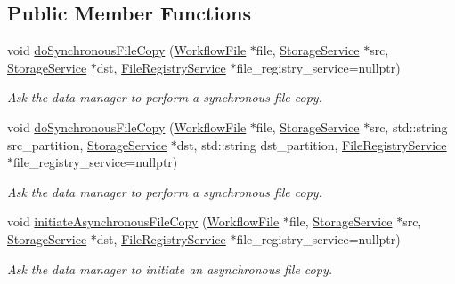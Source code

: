 \subsection*{Public Member Functions}
\begin{DoxyCompactItemize}
\item 
void \hyperlink{classwrench_1_1_data_movement_manager_a815bf4ed2a32b39c0e46a6f5a3c10e51}{do\+Synchronous\+File\+Copy} (\hyperlink{classwrench_1_1_workflow_file}{Workflow\+File} $\ast$file, \hyperlink{classwrench_1_1_storage_service}{Storage\+Service} $\ast$src, \hyperlink{classwrench_1_1_storage_service}{Storage\+Service} $\ast$dst, \hyperlink{classwrench_1_1_file_registry_service}{File\+Registry\+Service} $\ast$file\+\_\+registry\+\_\+service=nullptr)
\begin{DoxyCompactList}\small\item\em Ask the data manager to perform a synchronous file copy. \end{DoxyCompactList}\item 
void \hyperlink{classwrench_1_1_data_movement_manager_ad9c2dd49c769884e01932df7ac90bb0e}{do\+Synchronous\+File\+Copy} (\hyperlink{classwrench_1_1_workflow_file}{Workflow\+File} $\ast$file, \hyperlink{classwrench_1_1_storage_service}{Storage\+Service} $\ast$src, std\+::string src\+\_\+partition, \hyperlink{classwrench_1_1_storage_service}{Storage\+Service} $\ast$dst, std\+::string dst\+\_\+partition, \hyperlink{classwrench_1_1_file_registry_service}{File\+Registry\+Service} $\ast$file\+\_\+registry\+\_\+service=nullptr)
\begin{DoxyCompactList}\small\item\em Ask the data manager to perform a synchronous file copy. \end{DoxyCompactList}\item 
void \hyperlink{classwrench_1_1_data_movement_manager_a3ddeb9700a10b5f249b91786e6dddcb0}{initiate\+Asynchronous\+File\+Copy} (\hyperlink{classwrench_1_1_workflow_file}{Workflow\+File} $\ast$file, \hyperlink{classwrench_1_1_storage_service}{Storage\+Service} $\ast$src, \hyperlink{classwrench_1_1_storage_service}{Storage\+Service} $\ast$dst, \hyperlink{classwrench_1_1_file_registry_service}{File\+Registry\+Service} $\ast$file\+\_\+registry\+\_\+service=nullptr)
\begin{DoxyCompactList}\small\item\em Ask the data manager to initiate an asynchronous file copy. \end{DoxyCompactList}\item 

\end{DoxyCompactItemize}
